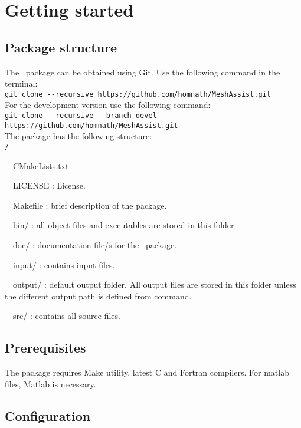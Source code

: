 \chapter{Getting started}
\label{chap:start}
\section{Package structure}
The \pack\ package can be obtained using Git. Use the following command in the terminal:\\

\texttt{git clone -{}-recursive https://github.com/homnath/MeshAssist.git}\\

For the development version use the following command:\\

\texttt{git clone -{}-recursive -{}-branch devel https://github.com/homnath/MeshAssist.git}\\

The package has the following structure:\\

\texttt{\pack/}
\begin{adescription}{~~CMakeLists.txt}
\item[~~LICENSE]               : License.
\item[~~Makefile]                : brief description of the package.
\item[~~bin/]                  : all object files and executables are stored in this folder.
\item[~~doc/]                  : documentation file/s for the \pack\ package.
\item[~~input/]                : contains input files.
\item[~~output/]               : default output folder. All output files are stored in this folder unless the different output path is defined from command.
\item[~~src/]                  : contains all source files.
\end{adescription}
 
\section{Prerequisites}

The package requires Make utility, latest C and Fortran compilers. For matlab files, Matlab is necessary.

\section{Configuration}

